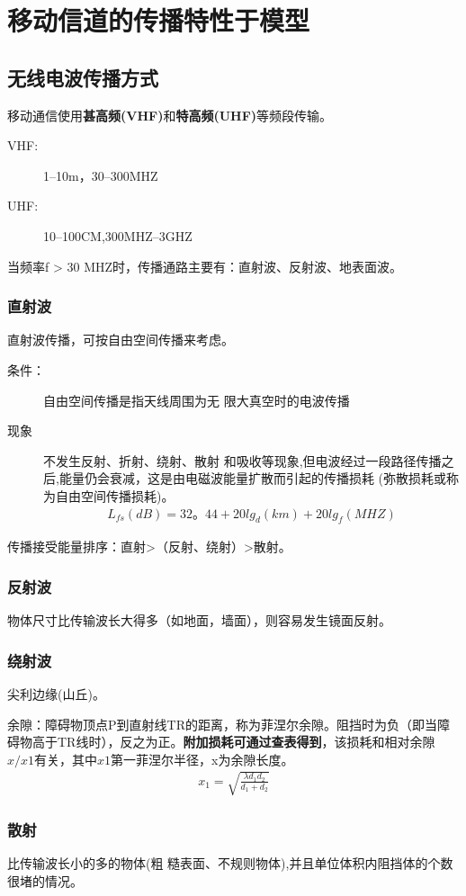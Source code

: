 \chapter{移动信道的传播特性于模型}
\section{无线电波传播方式
}
移动通信使用\textbf{甚高频(VHF)}和\textbf{特高频(UHF)}等频段传输。
\begin{description}
	\item[VHF:] 1--10m，30--300MHZ
	\item[UHF:] 10--100CM,300MHZ--3GHZ
\end{description}
当频率f > 30 MHZ时，传播通路主要有：直射波、反射波、地表面波。
\subsection{直射波}
直射波传播，可按自由空间传播来考虑。
\begin{description}
	\item[条件：] 自由空间传播是指天线周围为无
	限大真空时的电波传播
	\item[现象] 不发生反射、折射、绕射、散射
	和吸收等现象,但电波经过一段路径传播之
	后,能量仍会衰减，这是由电磁波能量扩散而引起的传播损耗
	(弥散损耗或称为自由空间传播损耗)。
	\begin{eqnarray}
	L_{fs}(dB) = 32。44 + 20lg_d(km)+20lg_f(MHZ)
	\end{eqnarray}
\end{description}
传播接受能量排序：直射>（反射、绕射）>散射。
\subsection{反射波}
物体尺寸比传输波长大得多（如地面，墙面），则容易发生镜面反射。
\subsection{绕射波}
尖利边缘(山丘)。

余隙：障碍物顶点P到直射线TR的距离，称为菲涅尔余隙。阻挡时为负（即当障碍物高于TR线时），反之为正。\textbf{附加损耗可通过查表得到}，该损耗和相对余隙$x/x1$有关，其中\(x1\)第一菲涅尔半径，x为余隙长度。
\begin{eqnarray}
x_1 = \sqrt{\frac{\lambda d_1d_2}{d_1+d_2}}
\end{eqnarray}
\subsection{散射}
比传输波长小的多的物体(粗
糙表面、不规则物体),并且单位体积内阻挡体的个数很堵的情况。
